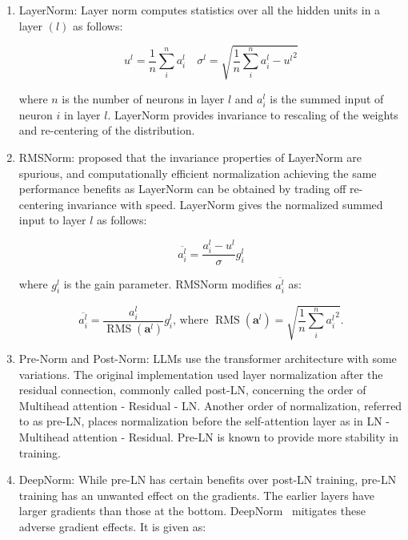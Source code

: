 \documentclass[a4paper,oneside]{book}
\begin{document}
\begin{enumerate}
  \item LayerNorm: Layer norm computes statistics over all the hidden units in a layer $(l)$ as follows:

        \begin{equation}
          u^{l} = \frac{1}{n} \sum_{i}^{n} a_{i}^{l} \quad \sigma^{l} = \sqrt{\frac{1}{n} \sum_{i}^{n}{a_{i}^{l}-u^{l}}^{2}}
        \end{equation}

        where $n$ is the number of neurons in layer $l$ and $a_{i}^{l}$ is the summed input of neuron $i$ in layer $l$. LayerNorm provides invariance to rescaling of the weights and re-centering of the distribution.

  \item RMSNorm: proposed that the invariance properties of LayerNorm are spurious, and computationally efficient normalization achieving the same performance benefits as LayerNorm can be obtained by trading off re-centering invariance with speed. LayerNorm gives the normalized summed input to layer $l$ as follows:

        \begin{equation}
          \overline{a_{i}^{l}} = \frac{a_{i}^{l}-u^{l}}{\sigma} g_{i}^{l}
        \end{equation}

        where $g_{i}^{l}$ is the gain parameter. RMSNorm modifies $\overline{a_{i}^{l}}$ as:

        \begin{equation}
          \overline{a_{i}^{l}} = \frac{a_{i}^{l}}{\operatorname{RMS}\left(\mathbf{a}^{l}\right)} g_{i}^{l} \text {, where } \operatorname{RMS}\left(\mathbf{a}^{l}\right) = \sqrt{\frac{1}{n} \sum_{i}^{n}{a_{i}^{l}}^{2}}.
        \end{equation}

  \item Pre-Norm and Post-Norm: LLMs use the transformer architecture with some variations. The original implementation used layer normalization after the residual connection, commonly called post-LN, concerning the order of Multihead attention - Residual - LN. Another order of normalization, referred to as pre-LN, places normalization before the self-attention layer as in LN - Multihead attention - Residual. Pre-LN is known to provide more stability in training.

  \item DeepNorm: While pre-LN has certain benefits over post-LN training, pre-LN training has an unwanted effect on the gradients. The earlier layers have larger gradients than those at the bottom. DeepNorm~\cite{wang2022deepnet} mitigates these adverse gradient effects. It is given as:


\end{enumerate}
\end{document}
